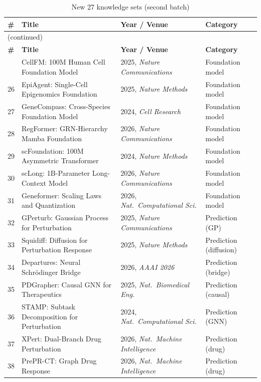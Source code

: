 \documentclass[12pt, a4paper]{article}
\begin{document}
\begin{longtable}{@{}p{0.5cm}p{5.4cm}p{3.2cm}p{3.6cm}@{}}
\caption{New 27 knowledge sets (second batch)} \label{tab:kb2} \\
\toprule
\textbf{\#} & \textbf{Title} & \textbf{Year / Venue} & \textbf{Category} \\
\midrule
\endfirsthead
\multicolumn{4}{l}{\small(continued)} \\
\toprule
\textbf{\#} & \textbf{Title} & \textbf{Year / Venue} & \textbf{Category} \\
\midrule
\endhead
\bottomrule
\endfoot
25 & CellFM: 100M Human Cell Foundation Model     & 2025, \textit{Nature Communications} & Foundation model \\
26 & EpiAgent: Single-Cell Epigenomics Foundation  & 2025, \textit{Nature Methods}        & Foundation model \\
27 & GeneCompass: Cross-Species Foundation Model   & 2024, \textit{Cell Research}         & Foundation model \\
28 & RegFormer: GRN-Hierarchy Mamba Foundation     & 2026, \textit{Nature Communications} & Foundation model \\
29 & scFoundation: 100M Asymmetric Transformer     & 2024, \textit{Nature Methods}        & Foundation model \\
30 & scLong: 1B-Parameter Long-Context Model       & 2026, \textit{Nature Communications} & Foundation model \\
31 & Geneformer: Scaling Laws and Quantization     & 2026, \textit{Nat.\ Computational Sci.} & Foundation model \\
32 & GPerturb: Gaussian Process for Perturbation   & 2025, \textit{Nature Communications} & Prediction (GP) \\
33 & Squidiff: Diffusion for Perturbation Response & 2025, \textit{Nature Methods}        & Prediction (diffusion) \\
34 & Departures: Neural Schr\"{o}dinger Bridge     & 2026, \textit{AAAI 2026}             & Prediction (bridge) \\
35 & PDGrapher: Causal GNN for Therapeutics        & 2025, \textit{Nat.\ Biomedical Eng.} & Prediction (causal) \\
36 & STAMP: Subtask Decomposition for Perturbation & 2024, \textit{Nat.\ Computational Sci.} & Prediction (GNN) \\
37 & XPert: Dual-Branch Drug Perturbation          & 2026, \textit{Nat.\ Machine Intelligence} & Prediction (drug) \\
38 & PrePR-CT: Graph Drug Response                 & 2026, \textit{Nat.\ Machine Intelligence} & Prediction (drug) \\

\end{longtable}
\end{document}
